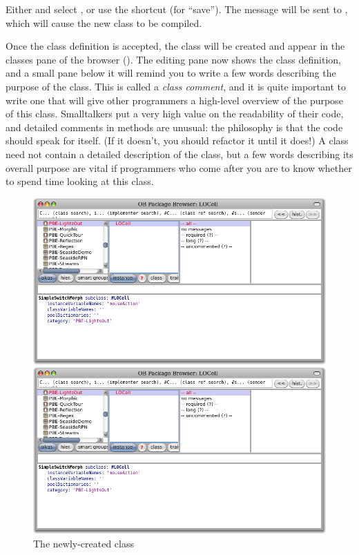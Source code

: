 \documentclass[a4paper,10pt,twoside]{book}
\begin{document}
Either \actclick and select , or use the shortcut  (for ``save'').
The message will be sent to , which will cause the new class to be compiled.

Once the class definition is accepted, the class will be created and appear in the classes pane of the browser ().
The editing pane now shows the class definition, and a small pane below it will remind you to write a few words describing the purpose of the class. This is called a \emph{class comment}, and it is quite important to write one that will give other programmers a high-level overview of the purpose of this class.
Smalltalkers put a very high value on the readability of their code, and detailed comments in methods are unusual: the philosophy is that the code should speak for itself. (If it doesn't, you should refactor it until it does!) A class  need not contain a detailed description of the class, but a few words describing its overall purpose are vital if programmers who come after you are to know whether to spend time looking at this class.


\begin{figure}[h!t]
\ifluluelse
	{\centerline {\includegraphics[width=\textwidth]{LOCell}}}
	{\centerline {\includegraphics[scale=0.7]{LOCell}}}
\caption{The newly-created class }
\end{figure}
\end{document}

